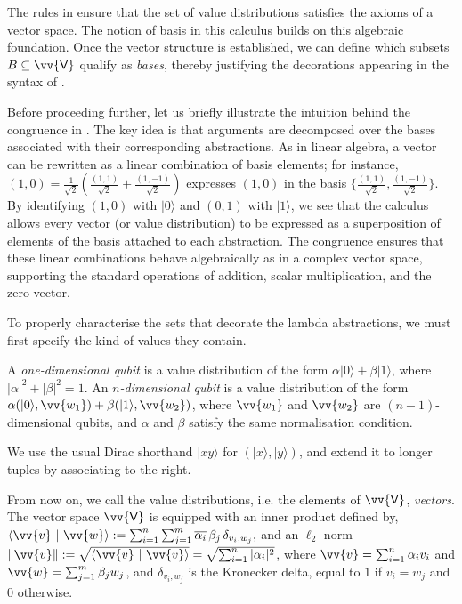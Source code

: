 \documentclass[runningheads,orivec,envcountsame,envcountsect]{llncs}
\newcommand\ket[1]{\ensuremath{|#1\rangle}}
\DeclareRobustCommand{\ValD}{\ensuremath{\vv{\mathsf{V}}}}
\def\scal#1#2{\langle{#1}~|~{#2}\rangle}
\def\Pair#1#2{(#1,#2)} %
\begin{document}
The rules in  ensure that the
set of value distributions satisfies the axioms of a vector space.  The notion
of basis in this calculus builds on this algebraic foundation. Once the vector
structure is established, we can define which subsets $B\subseteq \ValD$
qualify as \emph{bases}, thereby justifying the decorations appearing in the
syntax of .


Before proceeding further, let us briefly illustrate the intuition behind the
congruence in .  
The key idea is that arguments are decomposed over the bases associated with
their corresponding abstractions.  
As in linear algebra, a vector can be rewritten as a linear combination of
basis elements; for instance,
\(
  (1,0)
  = \tfrac{1}{\sqrt{2}}\!\left(\tfrac{(1,1)}{\sqrt{2}}
  + \tfrac{(1,-1)}{\sqrt{2}}\right)
\)
expresses $(1,0)$ in the basis
$\{\tfrac{(1,1)}{\sqrt{2}}, \tfrac{(1,-1)}{\sqrt{2}}\}$.
By identifying $(1,0)$ with $\ket{0}$ and $(0,1)$ with $\ket{1}$, we see that
the calculus allows every vector (or value distribution) to be expressed as a
superposition of elements of the basis attached to each abstraction.
The congruence ensures that these linear combinations behave algebraically as
in a complex vector space, supporting the standard operations of addition,
scalar multiplication, and the zero vector.

To properly characterise the sets that decorate the lambda abstractions, we
must first specify the kind of values they contain.
\begin{definition}[Qubits]\label{def:Qubit}
  A \emph{one-dimensional qubit} is a value distribution of the form
  $\alpha\ket{0} + \beta\ket{1}$, where $|\alpha|^2 + |\beta|^2 = 1$. An
  \emph{$n$-dimensional qubit} is a value distribution of the form
  $\alpha\Pair{\ket{0}}{\vv{w_1}} + \beta\Pair{\ket{1}}{\vv{w_2}}$, where
  $\vv{w_1}$ and $\vv{w_2}$ are $(n-1)$-dimensional qubits, and $\alpha$ and
  $\beta$ satisfy the same normalisation condition.
\end{definition}
We use the usual Dirac shorthand $\ket{xy}$ for $(\ket{x},\ket{y})$, and
extend it to longer tuples by associating to the right.

From now on, we call the value distributions, i.e. the elements of $\ValD$,
\emph{vectors}. The vector space $\ValD$ is equipped with an inner
product defined by,  
\(
  \scal{\vv{v}}{\vv{w}} := \sum_{i=1}^n\sum_{j=1}^m
  \overline{\alpha_i}\,\beta_j\,\delta_{v_i,w_j},
\)
and an $\ell_2$-norm 
\(
  \|\vv{v}\| := \sqrt{\scal{\vv{v}}{\vv{v}}}
  = \sqrt{\sum_{i=1}^n|\alpha_i|^2}
\),
where $\vv{v}=\sum_{i=1}^n\alpha_i v_i$ and
$\vv{w}=\sum_{j=1}^m\beta_j w_j$, and $\delta_{v_i,w_j}$ is the Kronecker
delta, equal to $1$ if $v_i=w_j$ and $0$ otherwise.
\end{document}
